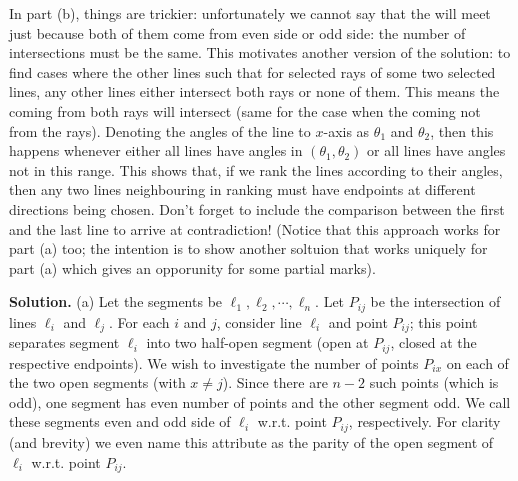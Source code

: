 \documentclass[11pt,a4paper]{article}
\begin{document}
\begin{itemize}
In part (b), things are trickier: unfortunately we cannot say that the \animals will meet just because both of them come from even side or odd side: the number of intersections must be the same. 
This motivates another version of the solution: 
to find cases where the other lines such that for selected rays of some two selected lines, any other lines either intersect both rays or none of them. 
This means the \animals coming from both rays will intersect (same for the case when the \animals coming not from the rays). 
Denoting the angles of the line to $x$-axis as $\theta_1$ and $\theta_2$, then this happens whenever either all lines have angles in $(\theta_1, \theta_2)$ or all lines have angles not in this range. 
This shows that, if we rank the lines according to their angles, then any two lines neighbouring in ranking must have endpoints at different directions being chosen. 
Don't forget to include the comparison between the first and the last line to arrive at contradiction!
(Notice that this approach works for part (a) too; the intention is to show another soltuion that works uniquely for part (a) which gives an opporunity for some partial marks). 

\textbf{Solution.} 
(a) Let the segments be $\ell_1, \ell_2, \cdots , \ell_n$. 
Let $P_{ij}$ be the intersection of lines $\ell_i$ and $\ell_j$. 
For each $i$ and $j$, consider line $\ell_i$ and point $P_{ij}$; this point separates segment $\ell_i$ into two half-open segment (open at $P_{ij}$, closed at the respective endpoints). 
We wish to investigate the number of points $P_{ix}$ on each of the two open segments (with $x\neq j$). 
Since there are $n-2$ such points (which is odd), 
one segment has even number of points and the other segment odd. 
We call these segments even and odd side of $\ell_i$ w.r.t. point $P_{ij}$, respectively. 
For clarity (and brevity) we even name this attribute as the parity of the open segment of $\ell_i$ w.r.t. point $P_{ij}$. 


\end{itemize}
\end{document}
